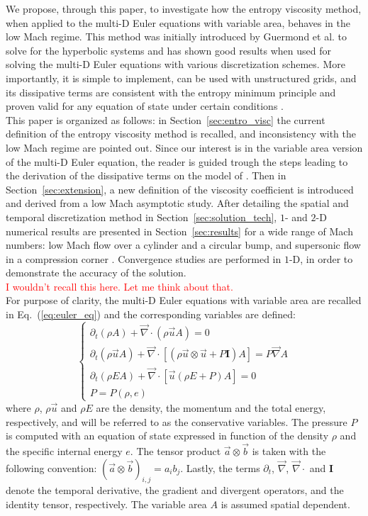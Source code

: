 \documentclass[preprint,10pt]{elsarticle}
\renewcommand{\div}{\vec{\nabla}\! \cdot \!}
\newcommand{\grad}{\vec{\nabla}}
\newcommand{\eqt}[1]{Eq.~(\ref{#1})}                     %
\newcommand{\sct}[1]{Section~\ref{#1}}                   %
\newcommand{\tcr}[1]{\textcolor{red}{#1}}
\begin{document}
We propose, through this paper, to investigate how the entropy viscosity method, when applied to the multi-D Euler equations with variable area, behaves in the low Mach regime. This method was initially introduced by Guermond et al. to solve for the hyperbolic systems and has shown good results when used for solving the multi-D Euler equations with various discretization schemes. More importantly, it is simple to implement, can be used with unstructured grids,  and its dissipative terms are consistent with the entropy minimum principle and proven valid for any equation of state under certain conditions \cite{jlg}. \\
This paper is organized as follows: in \sct{sec:entro_visc} the current definition of the entropy viscosity method is recalled, and inconsistency with the low Mach regime are pointed out. Since our interest is in the variable area version of the multi-D Euler equation, the reader is guided trough the steps leading to the derivation of the dissipative terms on the model of \cite{jlg}. Then in \sct{sec:extension}, a new definition of the viscosity coefficient is introduced and derived from a low Mach asymptotic study. After detailing the spatial and temporal discretization method in \sct{sec:solution_tech}, $1$- and $2$-D numerical results are presented in \sct{sec:results} for a wide range of Mach numbers: low Mach flow over a cylinder and a circular bump, and supersonic flow in a compression corner \cite{CompressionCorner}. Convergence studies are performed in $1$-D, in order to demonstrate the accuracy of the solution. \\
\tcr{I wouldn't recall this here. Let me think about that.}\\
For purpose of clarity, the multi-D Euler equations with variable area are recalled in \eqt{eq:euler_eq} and the corresponding variables are defined:
%
\begin{equation}
\label{eq:euler_eq}
\left\{ 
\begin{array}{lll}
\partial_t \left( \rho A\right) + \div \left( \rho \vec{u} A\right) = 0\\
\partial_t \left( \rho \vec{u} A\right) + \div \left[ \left( \rho \vec{u} \otimes \vec{u} + P \mathbf{I} \right) A \right] = P \grad A\\
\partial_t \left( \rho E A\right) + \div \left[ \vec{u} \left( \rho E + P \right) A\right] = 0 \\
P = P\left( \rho, e \right)
\end{array}
\right.
\end{equation}
%
where $\rho$, $\rho \vec{u}$ and $\rho E$ are the density, the momentum and the total energy, respectively, and will be referred to as the conservative variables. The pressure $P$ is computed with an equation of state expressed in function of the density $\rho$ and the specific internal energy $e$. The tensor product $\vec{a} \otimes \vec{b}$ is taken with the following convention: $(\vec{a} \otimes \vec{b})_{i,j} = a_i b_j$. Lastly, the terms $\partial_t$, $\grad$, $\div$ and $\mathbf{I}$ denote the temporal derivative, the gradient and divergent operators, and the identity tensor, respectively. The variable area $A$ is assumed spatial dependent.
\end{document}
